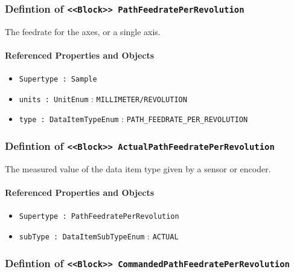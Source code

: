 \subsubsection{Defintion of \texttt{<<Block>> PathFeedratePerRevolution}}
  \label{type:PathFeedratePerRevolution}

\FloatBarrier

The feedrate for the axes, or a single axis.

\FloatBarrier
\paragraph{Referenced Properties and Objects}

\begin{itemize}
\item \texttt{Supertype : Sample}

\item \texttt{units : UnitEnum} : \texttt{MILLIMETER/REVOLUTION}

\item \texttt{type : DataItemTypeEnum} : \texttt{PATH_FEEDRATE_PER_REVOLUTION}

\end{itemize}
\FloatBarrier
\subsubsection{Defintion of \texttt{<<Block>> ActualPathFeedratePerRevolution}}
  \label{type:ActualPathFeedratePerRevolution}

\FloatBarrier

The measured value of the data item type given by a sensor or encoder.

\FloatBarrier
\paragraph{Referenced Properties and Objects}

\begin{itemize}
\item \texttt{Supertype : PathFeedratePerRevolution}

\item \texttt{subType : DataItemSubTypeEnum} : \texttt{ACTUAL}

\end{itemize}
\FloatBarrier
\subsubsection{Defintion of \texttt{<<Block>> CommandedPathFeedratePerRevolution}}
  \label{type:CommandedPathFeedratePerRevolution}

